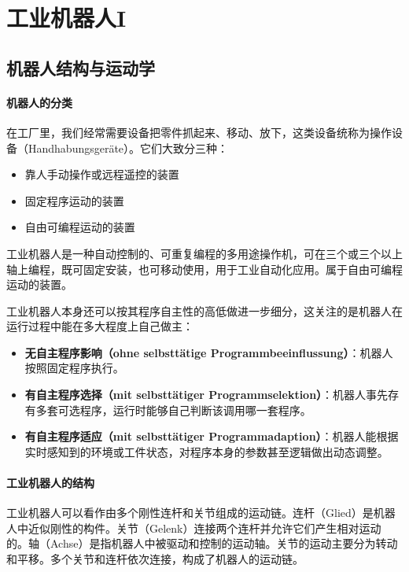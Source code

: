 \section{工业机器人I}

\subsection{机器人结构与运动学}

\paragraph{机器人的分类}

在工厂里，我们经常需要设备把零件抓起来、移动、放下，这类设备统称为操作设备（Handhabungsgeräte）。它们大致分三种：
\begin{itemize}
    \item 靠人手动操作或远程遥控的装置
    \item 固定程序运动的装置
    \item 自由可编程运动的装置
\end{itemize}
工业机器人是一种自动控制的、可重复编程的多用途操作机，可在三个或三个以上轴上编程，既可固定安装，也可移动使用，用于工业自动化应用。属于自由可编程运动的装置。

工业机器人本身还可以按其程序自主性的高低做进一步细分，这关注的是机器人在运行过程中能在多大程度上自己做主：
\begin{itemize}
    \item \textbf{无自主程序影响（ohne selbsttätige Programmbeeinflussung）}：机器人按照固定程序执行。
    \item \textbf{有自主程序选择（mit selbsttätiger Programmselektion）}：机器人事先存有多套可选程序，运行时能够自己判断该调用哪一套程序。
    \item \textbf{有自主程序适应（mit selbsttätiger Programmadaption）}：机器人能根据实时感知到的环境或工件状态，对程序本身的参数甚至逻辑做出动态调整。
\end{itemize}

\paragraph{工业机器人的结构}

工业机器人可以看作由多个刚性连杆和关节组成的运动链。连杆（Glied）是机器人中近似刚性的构件。关节（Gelenk）连接两个连杆并允许它们产生相对运动的。轴（Achse）是指机器人中被驱动和控制的运动轴。关节的运动主要分为转动和平移。多个关节和连杆依次连接，构成了机器人的运动链。

